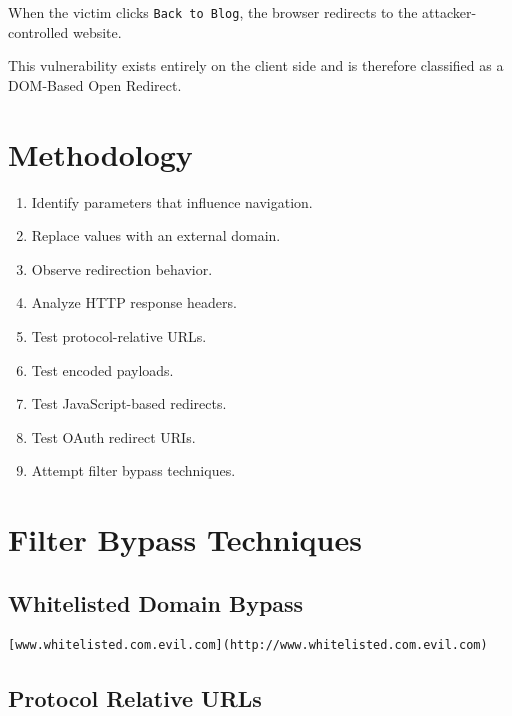 \documentclass{article}
\begin{document}
When the victim clicks \texttt{Back to Blog}, the browser redirects to the attacker-controlled website.

\begin{notebox}
This vulnerability exists entirely on the client side and is therefore classified as a DOM-Based Open Redirect.
\end{notebox}


\section{Methodology}

\begin{enumerate}
\item Identify parameters that influence navigation.
\item Replace values with an external domain.
\item Observe redirection behavior.
\item Analyze HTTP response headers.
\item Test protocol-relative URLs.
\item Test encoded payloads.
\item Test JavaScript-based redirects.
\item Test OAuth redirect URIs.
\item Attempt filter bypass techniques.
\end{enumerate}


\section{Filter Bypass Techniques}

\subsection{Whitelisted Domain Bypass}

\begin{lstlisting}
[www.whitelisted.com.evil.com](http://www.whitelisted.com.evil.com)
\end{lstlisting}

\subsection{Protocol Relative URLs}
\end{document}
